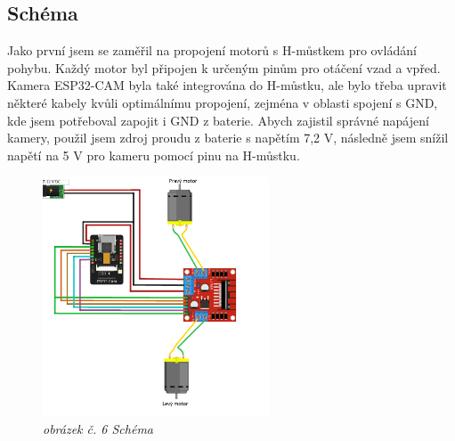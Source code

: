\documentclass[12pt, a4paper,
oneside,      %
openany
]{report}
\begin{document}
\subsection{Schéma}
\noindent Jako první jsem se zaměřil na propojení motorů s H-můstkem pro ovládání pohybu. Každý motor byl připojen k určeným pinům pro otáčení vzad a vpřed. Kamera ESP32-CAM byla také integrována do H-můstku, ale bylo třeba upravit některé kabely kvůli optimálnímu propojení, zejména v oblasti spojení s GND, kde jsem potřeboval zapojit i GND z baterie. Abych zajistil správné napájení kamery, použil jsem zdroj proudu z baterie s napětím 7,2 V, následně jsem snížil napětí na 5 V pro kameru pomocí pinu na H-můstku. 
\begin{figure}[H]
        \centering
		\includegraphics[width=0.6\textwidth]{image/schema.png}
        \caption*{\textit{obrázek č. 6 Schéma}}
        \label{fig:shema}
    \end{figure}
    
\end{document}

